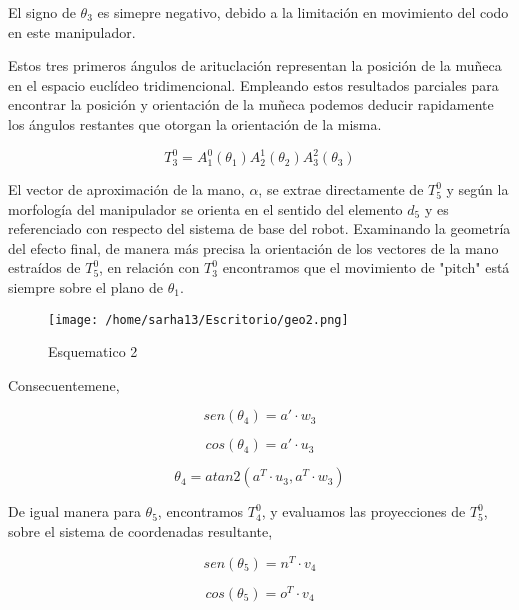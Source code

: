 \documentclass[letter,openright,12pt,spanish]{report}
\begin{document}
El signo de $\theta_3$ es simepre negativo, debido a la limitaci\'on en movimiento del codo en este manipulador.

Estos tres primeros \'angulos de arituclaci\'on representan la posici\'on de la mu\~neca en el espacio eucl\'ideo tridimencional. Empleando estos resultados parciales para encontrar la posici\'on y orientaci\'on de la mu\~neca podemos deducir rapidamente los \'angulos restantes que otorgan la orientaci\'on de la misma.

\begin{displaymath}
T^0_3=A^0_1(\theta_1)A^1_2(\theta_2)A^2_3(\theta_3)
\end{displaymath} 

El vector de aproximaci\'on de la mano, $\alpha $, se extrae directamente de $T^0_5$ y seg\'un la morfolog\'ia del manipulador se orienta en el sentido del elemento $d_5$ y es referenciado con respecto del sistema de base del robot. Examinando la geometr\'ia del efecto final, de manera m\'as precisa la orientaci\'on de los vectores de la mano estra\'idos de $T^0_5$, en relaci\'on con $T^0_3$ encontramos que el movimiento de "pitch" est\'a siempre sobre el plano de $\theta_1$.

\begin{figure}[htp]
\centering
\texttt{[image: /home/sarha13/Escritorio/geo2.png]}
\caption{Esquematico 2}
\label{Figura 2}
\end{figure}

Consecuentemene,

\begin{displaymath}
sen(\theta_4)=a'\cdot w_3
\end{displaymath}

\begin{displaymath}
cos(\theta_4)=a'\cdot u_3
\end{displaymath}

\begin{displaymath}
\theta_4=atan2(a^T\cdot u_3,a^T\cdot w_3)
\end{displaymath}

De igual manera para $\theta_5$, encontramos $T^0_4$, y evaluamos las proyecciones de $T^0_5$, sobre el sistema de coordenadas resultante,

\begin{displaymath}
sen(\theta_5)=n^T\cdot v_4
\end{displaymath}

\begin{displaymath}
cos(\theta_5)=o^T \cdot v_4
\end{displaymath}
\end{document}
